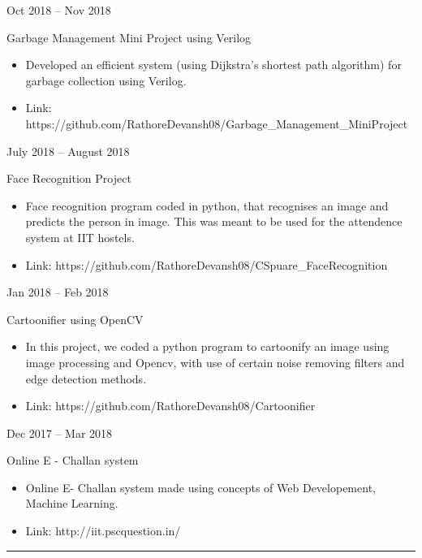 \documentclass[a4paper,10pt]{article}
\newlength{\cvcolumngapwidth}
\newlength{\cvleftcolumnwidth}
\newlength{\cvrightcolumnwidth}
\newcommand{\cvsectionstyle}[1]{{\normalsize\cvsectionfont\textcolor{cvsectioncolor}{#1}}}
\newcommand{\cvtitlestyle}[1]{{\large\cvtitlefont\textcolor{cvtitlecolor}{#1}}}
\newcommand{\cvdurationstyle}[1]{{\small\cvdurationfont\textcolor{cvdurationcolor}{#1}}}
\newlength{\cvafteritemskipamount}
\newlength{\cvaftersectionskipamount}
\newlength{\cvaftertitleskipamount}
\newlength{\cvparskip}
\newcommand{\cvsection}[1]{
    \begin{minipage}[t]{\cvleftcolumnwidth}
        \raggedleft\cvsectionstyle{#1}
    \end{minipage}%
    \hspace{\cvcolumngapwidth}%
    \begin{minipage}[t]{\cvrightcolumnwidth}
        \textcolor{cvrulecolor}{\rule{\cvrightcolumnwidth}{0.3mm}}
    \end{minipage}

    \vspace{\cvaftersectionskipamount}
}
\newcommand{\cvitem}[2]{
    \begin{minipage}[t]{\cvleftcolumnwidth}
        \raggedleft #1
    \end{minipage}%
    \hspace{\cvcolumngapwidth}%
    \begin{minipage}[t]{\cvrightcolumnwidth}
        \setlength{\parskip}{\cvparskip} #2
    \end{minipage}

    \vspace{\cvafteritemskipamount}
}
\newcommand{\cvtitle}[1]{
    \cvtitlestyle{#1}

    \vspace{\cvaftertitleskipamount}
    \vspace{-\cvparskip}
}
\begin{document}
\cvitem{
    \cvdurationstyle{Oct 2018 -- Nov 2018}
}{
    \cvtitle{Garbage Management Mini Project using Verilog}
    \begin{itemize}[leftmargin=*]
        \item Developed an efficient system (using Dijkstra's shortest path algorithm) for garbage collection
using Verilog.
        \item Link: https://github.com/RathoreDevansh08/Garbage\_Management\_MiniProject
        
    \end{itemize}
}

\cvitem{
    \cvdurationstyle{July 2018 -- August 2018}
}{
    \cvtitle{Face Recognition Project}

    \begin{itemize}[leftmargin=*]
        \item Face recognition program coded in python, that recognises an image and predicts the person in image. This was meant to be used for the attendence system at IIT hostels. 
        \item Link: https://github.com/RathoreDevansh08/CSpuare\_FaceRecognition
        
    \end{itemize}
}

\cvitem{
    \cvdurationstyle{Jan 2018 -- Feb 2018}
}{
    \cvtitle{Cartoonifier using OpenCV}
    \begin{itemize}[leftmargin=*]
        \item In this project, we coded a python program to cartoonify an image using image processing and Opencv, with use of certain noise removing filters and edge detection methods. 
        \item Link: https://github.com/RathoreDevansh08/Cartoonifier
        
    \end{itemize}
}

\cvitem{
    \cvdurationstyle{Dec 2017 -- Mar 2018}
}{
    \cvtitle{Online E - Challan system}
    \begin{itemize}[leftmargin=*]
        \item Online E- Challan system made using concepts of Web Developement, Machine Learning.
        \item Link: http://iit.pscquestion.in/
        
    \end{itemize}
}



\cvsection{TRAINING AND WORKSHOPS}
\end{document}
